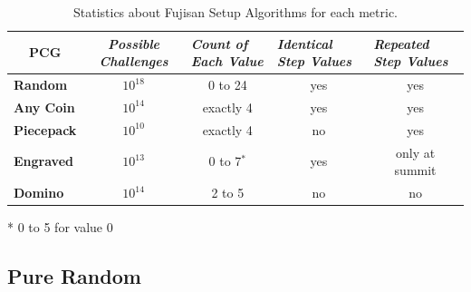 \documentclass[10pt,journal,compsoc]{IEEEtran}
\begin{document}
\begin{table}[]
\centering
\renewcommand{\arraystretch}{1.3}
\caption{Statistics about Fujisan Setup Algorithms for each metric.}
\label{table_stats}
\begin{tabular}{l|c|c|c|c|}
\multicolumn{1}{c|}{\textbf{PCG}} & \multicolumn{1}{c|}{\textit{\textbf{Possible Challenges}}} & \multicolumn{1}{l|}{\textit{\textbf{Count of Each Value}}} & \multicolumn{1}{l|}{\textit{\textbf{Identical Step Values}}} & \multicolumn{1}{l|}{\textit{\textbf{Repeated Step Values}}} \\ \hline
\textbf{Random}                   & $10^{18}$                                  & 0 to 24                                                    & yes                                                      & yes                                                            \\ \hline
\textbf{Any Coin}                 & $10^{14}$ & exactly 4                                                  & yes                                                      & yes                                                            \\ \hline
\textbf{Piecepack}                & $10^{10}$                                             & exactly 4                                                  & no                                                       & yes                                                            \\ \hline
\textbf{Engraved}                 & $10^{13}$                                                 & 0 to 7$^*$                                                     & yes                                                      & only at summit                                                 \\ \hline
\textbf{Domino}                   & $10^{14} $                                                   & 2 to 5                                                     & no                                                       & no                                                             \\ \hline
\end{tabular}

\vspace{0.2cm} * 0 to 5 for value 0
\end{table}

\subsection{Pure Random}
\end{document}
